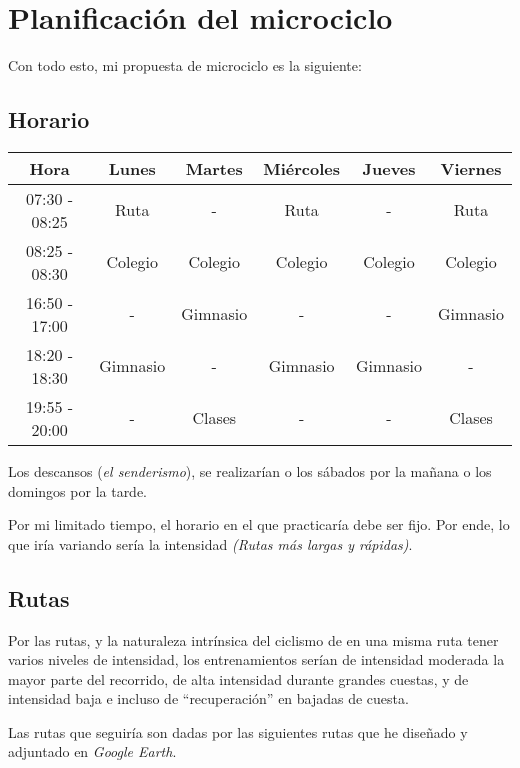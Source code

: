 \documentclass{article}
\begin{document}
\section{Planificación del microciclo}

Con todo esto, mi propuesta de microciclo es la siguiente:

\subsection{Horario}

\begin{tabular}{||c c c c c c||} 
\hline
Hora & Lunes & Martes & Miércoles & Jueves & Viernes \\ 
\hline\hline
07:30 - 08:25 & Ruta & - & Ruta & - & Ruta \\
\hline
08:25 - 08:30 & Colegio & Colegio & Colegio & Colegio & Colegio \\ 
\hline
16:50 - 17:00 & - & Gimnasio & - & - & Gimnasio \\
\hline
18:20 - 18:30 & Gimnasio & - & Gimnasio & Gimnasio & - \\
\hline
19:55 - 20:00 & - & Clases & - & - & Clases \\
\hline
\end{tabular}

Los descansos (\textit{el senderismo}), se realizarían o los sábados por la mañana o los domingos por la tarde.

Por mi limitado tiempo, el horario en el que practicaría debe ser fijo. Por ende, lo que iría variando sería la intensidad \textit{(Rutas más largas y rápidas)}.

\subsection{Rutas}

Por las rutas, y la naturaleza intrínsica del ciclismo de en una misma ruta tener varios niveles de intensidad, los entrenamientos serían de intensidad moderada la mayor parte del 
recorrido, de alta intensidad durante grandes cuestas, y de intensidad baja e incluso de ``recuperación'' en bajadas de cuesta.

Las rutas que seguiría son dadas por las siguientes rutas que he diseñado y adjuntado en \textit{Google Earth}.
\end{document}
